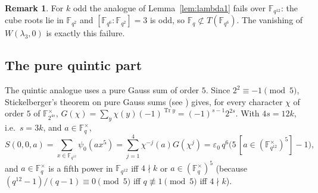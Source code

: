 \documentclass[11pt,a4paper]{amsart}
\theoremstyle{definition}
\newtheorem{remark}[theorem]{Remark}
\newcommand{\F}{\mathbb{F}}
\newcommand{\Tr}{\operatorname{Tr}}
\newcommand{\sgn}{\varepsilon_0}
\begin{document}
\begin{remark}
For $k$ odd the analogue of Lemma~\ref{lem:lambda1} fails over $\F_{q^{12}}$: the cube roots lie in $\F_{q^2}$ and $[\F_{q^6}:\F_{q^2}]=3$ is odd, so $\F_q\not\subset T(\F_{q^6})$. The vanishing of $W(\lambda_3,0)$ is exactly this failure.
\end{remark}

\subsection{The pure quintic part}
The quintic analogue uses a pure Gauss sum of order $5$. Since $2^2\equiv-1\pmod 5$, Stickelberger's theorem on pure Gauss sums (see \cite[Thm.~11.6.3]{BEW}) gives, for every character $\chi$ of order $5$ of $\F_{2^{4s}}^\times$, $G(\chi)=\sum_y\chi(y)(-1)^{\Tr y}=(-1)^{s-1}2^{2s}$. With $4s=12k$, i.e.\ $s=3k$, and $a\in\F_q^\times$,
\begin{equation}\label{eq:quinticgauss}
S(0,0,a)=\sum_{x\in\F_{q^{12}}}\psi_0(ax^5)=\sum_{j=1}^4\chi^{-j}(a)G(\chi^j)=\sgn\,q^6\bigl(5\,[a\in(\F_{q^{12}}^\times)^5]-1\bigr),
\end{equation}
and $a\in\F_q^\times$ is a fifth power in $\F_{q^{12}}$ iff $4\nmid k$ or $a\in(\F_q^\times)^5$ (because $(q^{12}-1)/(q-1)\equiv0\pmod5$ iff $q\not\equiv1\pmod5$ iff $4\nmid k$).
\end{document}

